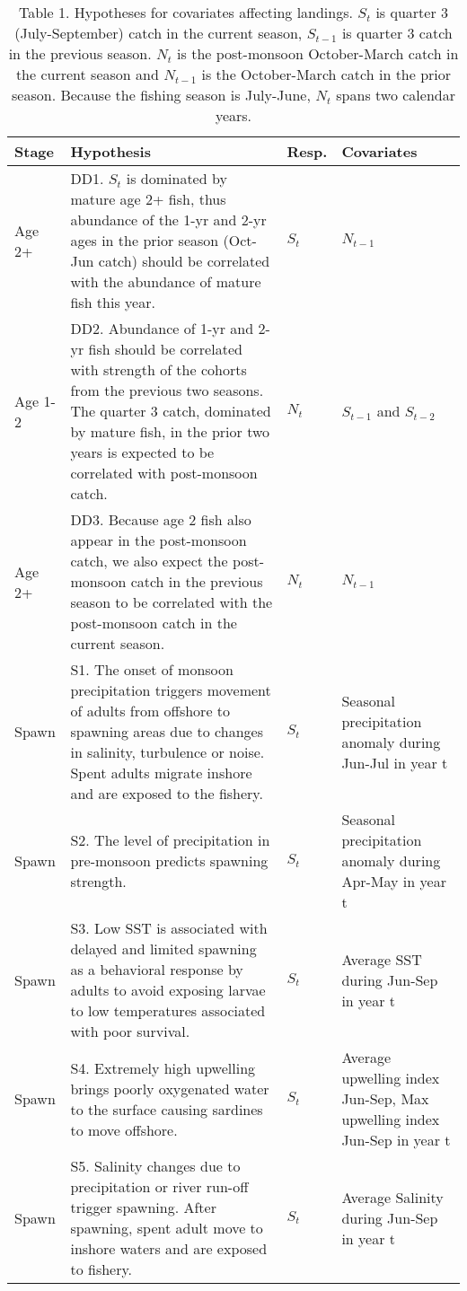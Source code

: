 
\begin{table}[t]

\caption{\label{tab:print-table-hyp}Table 1. Hypotheses for covariates affecting landings.  $S_t$ is quarter 3 (July-September) catch in the current season, $S_{t-1}$ is quarter 3 catch in the previous season. $N_t$ is the post-monsoon October-March catch in the current season and $N_{t-1}$ is the October-March catch in the prior season. Because the fishing season is July-June, $N_t$ spans two calendar years.}
\centering
\begin{tabular}{>{\raggedright\arraybackslash}p{1cm}|>{\raggedright\arraybackslash}p{8.5cm}|>{\raggedright\arraybackslash}p{1cm}|>{\raggedright\arraybackslash}p{3cm}}
\hline
Stage & Hypothesis & Resp. & Covariates\\
\hline
Age 2+ & DD1.  $S_t$ is dominated by mature age 2+ fish, thus abundance of the 1-yr and 2-yr ages in the prior season (Oct-Jun catch) should be correlated with the abundance of mature fish this year. & $S_t$ & $N_{t-1}$\\
\hline
Age 1-2 & DD2.  Abundance of 1-yr and 2-yr fish should be correlated with strength of the cohorts from the previous two seasons.  The quarter 3 catch, dominated by mature fish, in the prior two years is expected to be correlated with post-monsoon catch. & $N_t$ & $S_{t-1}$ and $S_{t-2}$\\
\hline
Age 2+ & DD3.  Because age 2 fish also appear in the post-monsoon catch, we also expect the post-monsoon catch in the previous season to be correlated with the post-monsoon catch in the current season. & $N_t$ & $N_{t-1}$\\
\hline
Spawn & S1.  The onset of monsoon precipitation triggers movement of adults from offshore to spawning areas due to changes in salinity, turbulence or noise. Spent adults migrate inshore and are exposed to the fishery. & $S_t$ & Seasonal precipitation anomaly during Jun-Jul in year t\\
\hline
Spawn & S2.  The level of precipitation in pre-monsoon predicts spawning strength. & $S_t$ & Seasonal precipitation anomaly during Apr-May in year t\\
\hline
Spawn & S3.  Low SST is associated with delayed and limited spawning as a behavioral response by adults to avoid exposing larvae to low temperatures associated with poor survival. & $S_t$ & Average SST during Jun-Sep in year t\\
\hline
Spawn & S4.  Extremely high upwelling brings poorly oxygenated water to the surface causing sardines to move offshore. & $S_t$ & Average upwelling index Jun-Sep, Max upwelling index Jun-Sep in year t\\
\hline
Spawn & S5. Salinity changes due to precipitation or river run-off trigger spawning.  After spawning, spent adult move to inshore waters and are exposed to fishery. & $S_t$ & Average Salinity during Jun-Sep in year t\\
\hline
\end{tabular}
\end{table}

